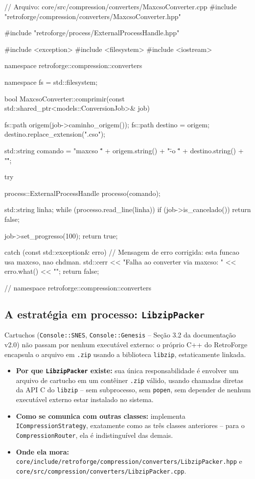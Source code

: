 \begin{CaixaCodigo}
// Arquivo: core/src/compression/converters/MaxcsoConverter.cpp
#include "retroforge/compression/converters/MaxcsoConverter.hpp"

#include "retroforge/process/ExternalProcessHandle.hpp"

#include <exception>
#include <filesystem>
#include <iostream>

namespace retroforge::compression::converters {

namespace fs = std::filesystem;

bool MaxcsoConverter::comprimir(const std::shared_ptr<models::ConversionJob>& job) {
    fs::path origem(job->caminho_origem());
    fs::path destino = origem;
    destino.replace_extension(".cso");

    std::string comando = "maxcso \"" + origem.string() + "\" -o \"" + destino.string() + "\"";

    try {
        process::ExternalProcessHandle processo(comando);

        std::string linha;
        while (processo.read_line(linha)) {
            if (job->is_cancelado()) {
                return false;
            }
        }

        job->set_progresso(100);
        return true;

    } catch (const std::exception& erro) {
        // Mensagem de erro corrigida: esta funcao usa maxcso, nao chdman.
        std::cerr << "Falha ao converter via maxcso: " << erro.what() << "\n";
        return false;
    }
}

} // namespace retroforge::compression::converters
\end{CaixaCodigo}

\subsection{A estratégia em processo: \texttt{LibzipPacker}}

Cartuchos (\texttt{Console::SNES}, \texttt{Console::Genesis} -- Seção 3.2 da documentação v2.0) não passam por nenhum executável externo: o próprio C++ do RetroForge encapsula o arquivo em \texttt{.zip} usando a biblioteca \texttt{libzip}, estaticamente linkada.

\begin{itemize}
    \item \textbf{Por que \texttt{LibzipPacker} existe:} sua única responsabilidade é envolver um arquivo de cartucho em um contêiner \texttt{.zip} válido, usando chamadas diretas da API C do \texttt{libzip} -- sem subprocesso, sem \texttt{popen}, sem depender de nenhum executável externo estar instalado no sistema.
    \item \textbf{Como se comunica com outras classes:} implementa \texttt{ICompressionStrategy}, exatamente como as três classes anteriores -- para o \texttt{CompressionRouter}, ela é indistinguível das demais.
    \item \textbf{Onde ela mora:} \texttt{core/include/retroforge/compression/converters/LibzipPacker.hpp} e \texttt{core/src/compression/converters/LibzipPacker.cpp}.
\end{itemize}

